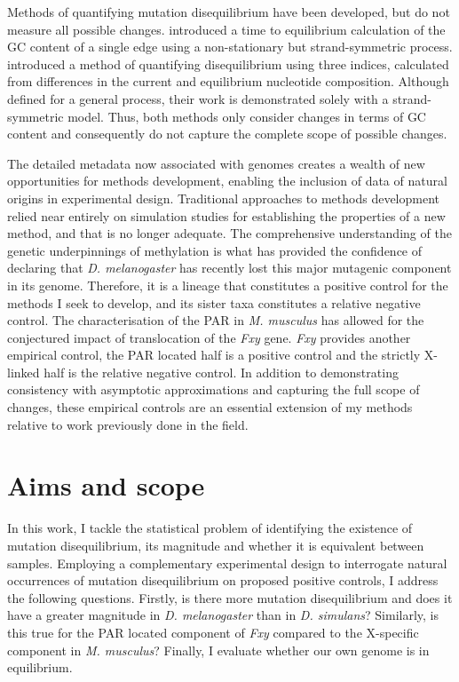 Methods of quantifying mutation disequilibrium have been developed, but do not measure all possible changes. \cite{Singh2009StrongDrosophila} introduced a time to equilibrium calculation of the GC content of a single \gls{edge} using a non-stationary but strand-symmetric process. \cite{Squartini2008QuantifyingProcess} introduced a method of quantifying disequilibrium using three indices, calculated from differences in the current and equilibrium nucleotide composition. Although defined for a general process, their work is demonstrated solely with a strand-symmetric model. Thus, both methods only consider changes in terms of GC content and consequently do not capture the complete scope of possible changes.

The detailed metadata now associated with genomes creates a wealth of new opportunities for methods development, enabling the inclusion of data of natural origins in experimental design. Traditional approaches to methods development relied near entirely on simulation studies for establishing the properties of a new method, and that is no longer adequate. The comprehensive understanding of the genetic underpinnings of methylation is what has provided the confidence of declaring that \textit{D. melanogaster} has recently lost this major mutagenic component in its genome. Therefore, it is a lineage that constitutes a positive control for the methods I seek to develop, and its sister taxa constitutes a relative negative control. The characterisation of the PAR in \textit{M. musculus} has allowed for the conjectured impact of translocation of the \textit{Fxy} gene. \textit{Fxy} provides another empirical control, the PAR located half is a positive control and the strictly X-linked half is the relative negative control. In addition to demonstrating consistency with asymptotic approximations and capturing the full scope of changes, these empirical controls are an essential extension of my methods relative to work previously done in the field. 

\section{Aims and scope}

In this work, I tackle the statistical problem of identifying the existence of mutation disequilibrium, its magnitude and whether it is equivalent between samples. Employing a complementary experimental design to interrogate natural occurrences of mutation disequilibrium on proposed positive controls, I address the following questions. Firstly, is there more mutation disequilibrium and does it have a greater magnitude in \textit{D. melanogaster} than in \textit{D. simulans}? Similarly, is this true for the PAR located component of \textit{Fxy} compared to the X-specific component in \textit{M. musculus}? Finally, I evaluate whether our own genome is in equilibrium. 

